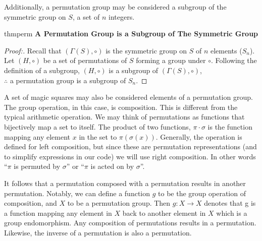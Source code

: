 \documentclass[12pt]{report}
\begin{document}

\par Additionally, a permutation group may be considered a subgroup of the symmetric group on $S$,
a set of $n$ integers.

\singlespacing{}
\begin{thmbox}{}{thmperm}
  \textbf{A Permutation Group is a Subgroup of The Symmetric Group}
  \begin{proof}[Proof:]
    Recall that $\left(\varGamma\left(S\right), \circ \right)$ is the symmetric group on $S$ of $n$
    elements ($S_n$). Let $\left(H,\circ\right)$ be a set of permutations of $S$ forming a group
    under
    $\circ$. Following the definition of a subgroup, $\left(H,\circ\right)$ is a subgroup of
    $\left(\varGamma\left(S\right), \circ \right)$,\\ $\therefore$ a permutation group is a
    subgroup of
    $S_n$.
  \end{proof}
\end{thmbox}
\doublespacing{}

\par A set of magic squares may also be considered elements of a permutation group. The group
operation, in this case, is composition. This is different from the typical arithmetic operation.
We may think of permutations as functions that bijectively map a set to itself. The product of two
functions, $\pi\cdot\sigma$ is the function mapping any element $x$ in the set to
$\pi\left(\sigma\left(x\right)\right)$. Generally, the operation is defined for left composition,
but since these are permutation representations (and to simplify expressions in our code) we will
use right composition. In other words ``$\pi$ is permuted by $\sigma$'' or ``$\pi$ is acted on by
$\sigma$''.

\par It follows that a permutation composed with a permutation results in another permutation.
Notably, we can define a function $g$ to be the group operation of composition, and $X$ to be a
permutation group. Then $g:X\rightarrow X$ denotes that g is a function mapping any element in $X$
back to another element in $X$ which is a group endomorphism. Any composition of permutations
results in a permutation. Likewise, the inverse of a permutation is also a permutation.
\end{document}

